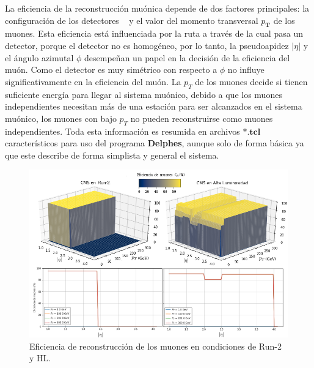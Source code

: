 La eficiencia de la reconstrucción muónica depende de dos factores principales: la configuración de los detectores \CMS ~ y el valor del  momento transversal $p_\mathbf{T}$ de los muones. Esta eficiencia está influenciada por la ruta a través de la cual pasa un detector, porque el detector no es homogéneo, por lo tanto, la pseudoapidez $|\eta|$ y el ángulo azimutal $\phi$ desempeñan un papel en la decisión de la eficiencia del muón. Como el detector es muy simétrico con respecto a $\phi$ no influye significativamente en la eficiencia del muón. La $p_T$ de los muones decide si tienen suficiente energía para llegar al sistema muónico, debido a que los muones independientes necesitan más de una estación para ser alcanzados en el sistema muónico, los muones con bajo $p_T$ no pueden reconstruirse como muones independientes. Toda esta información es resumida en archivos $\mathbf{*.tcl}$ característicos para uso del programa \textbf{Delphes}, aunque solo de forma básica ya que este describe de forma simplista y general el sistema.

\begin{figure}[!t]
\centering
\includegraphics[width=1\textwidth]{Analisis_y_Resultados/imagenes/Eficiencia_of_Muon.png}
\caption{Eficiencia de reconstrucción de los muones en condiciones de Run-2 y HL.}
\label{Compara_eficiencia_muon}
\end{figure}











